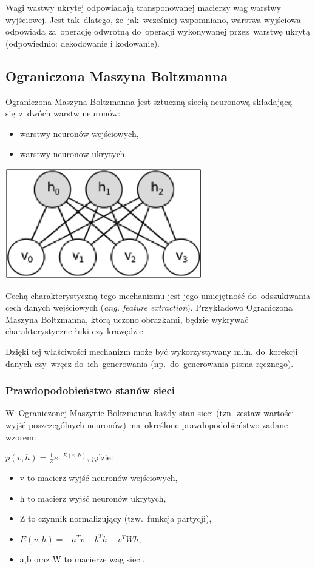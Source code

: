 Wagi wastwy ukrytej odpowiadają transponowanej macierzy wag warstwy wyjściowej. Jest tak~dlatego, że~jak~wcześniej
wspomniano, warstwa wyjściowa odpowiada za~operację odwrotną do~operacji wykonywanej przez~warstwę ukrytą (odpowiednio:
dekodowanie i kodowanie).

\subsection{Ograniczona Maszyna Boltzmanna}
Ograniczona Maszyna Boltzmanna jest sztuczną siecią neuronową składającą się~z~dwóch warstw neuronów:
\begin{itemize}
  \item warstwy neuronów wejściowych,
  \item warstwy neuronow ukrytych.
\end{itemize}

\begin{Figure}
	\centering
	\includegraphics[width=0.5\linewidth]{img/RBM.png}
\end{Figure}

Cechą charakterystyczną tego mechanizmu jest jego umiejętność do~odszukiwania cech danych wejściowych
(\textit{ang. feature extraction}). Przykładowo Ograniczona Maszyna Boltzmanna, którą uczono obrazkami, będzie
wykrywać charakterystyczne łuki czy krawędzie.

Dzięki tej właściwości mechanizm może być wykorzystywany m.in. do~korekcji danych czy~wręcz do~ich~generowania
(np.~do~generowania pisma ręcznego).

\subsubsection{Prawdopodobieństwo stanów sieci}
W~Ograniczonej Maszynie Boltzmanna każdy stan sieci (tzn. zestaw wartości wyjść poszczególnych neuronów)
ma~określone prawdopodobieństwo zadane wzorem:

$p(v,h)=\frac{1}{Z}e^{-E(v,h)}$, gdzie:
\begin{itemize}
  \item v to macierz wyjść neuronów wejściowych,
  \item h to macierz wyjść neuronów ukrytych,
  \item Z to czynnik normalizujący (tzw.~funkcja partycji),
  \item $E(v,h)=-a^{T}v-b^{T}h-v^{T}Wh$,
  \item a,b oraz W to macierze wag sieci.
\end{itemize}

